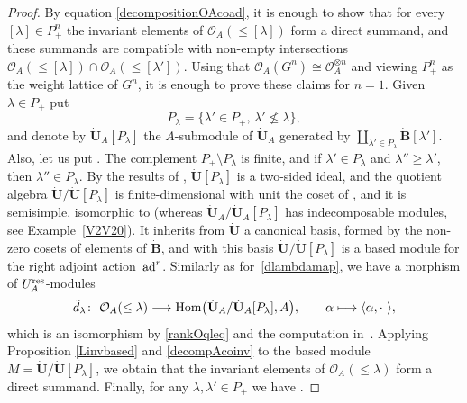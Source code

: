 \documentclass[pdftex]{sigma}
\numberwithin{equation}{section}
\theoremstyle{definition}
\newcommand{\mc}{\mathbb{C}}
\newcommand{\Oo}{{\mathcal O}}
\begin{document}
\begin{proof} By equation \eqref{decompositionOAcoad}, it is enough to show that for every $[\lambda]\in P_+^n$ the invariant elements of $\Oo_A(\leq [\lambda])$ form a direct summand, and these summands are compatible with non-empty intersections $\Oo_A(\leq [\lambda]) \cap \Oo_A(\leq [\lambda'])$. Using that $\Oo_A(G^n) \cong \Oo_A^{\otimes n}$ and viewing $P_+^n$ as the weight lattice of $G^n$, it is enough to prove these claims for $n=1$. Given $\lambda\in P_+$ put
\[P_{\lambda} = \{\lambda'\in P_+, \, \lambda' \nleqslant \lambda\},\]
and denote by $\dot{\mathbf{U}}_A [P_\lambda]$ the $A$-submodule of $\dot{\mathbf{U}}_A$ generated by $\coprod_{\lambda' \in P_\lambda} \dot{\mathbf{B}} [\lambda']$. Also, let us put \smash{$\dot{\mathbf{U}} [P_\lambda]= \dot{\mathbf{U}}_A [P_\lambda]\bigotimes_A \mc(q)$}.
The complement $P_+\setminus P_{\lambda}$ is finite, and if $\lambda'\in P_{\lambda}$ and $\lambda''\geq \lambda'$, then $\lambda''\in P_{\lambda}$. By the results of \cite[Section~29.2]{Lusztig}, $ \dot{\mathbf{U}} [P_\lambda]$ is a two-sided ideal, and the quotient algebra $\dot{\mathbf{U}} / \dot{\mathbf{U}} [P_\lambda]$ is finite-dimensional with unit the coset of , and it is semisimple, isomorphic to  (whereas $\dot{\mathbf{U}}_A / \dot{\mathbf{U}}_A [P_\lambda]$ has indecomposable modules, see Example~\ref{V2V20}).
It inherits from $\dot{\mathbf{U}}$ a canonical basis, formed by the non-zero cosets of elements of $\dot{\mathbf{B}}$, and with this basis $\dot{\mathbf{U}} / \dot{\mathbf{U}} [P_\lambda]$ is a based module for the right adjoint action~${\rm ad}^r$. Similarly as for~\eqref{dlambdamap}, we have a morphism of $U_A^{\rm res}$-modules
\[
\tilde{d}_\lambda\colon\ \Oo_A(\leq \lambda)\longrightarrow {\rm Hom} \big( \dot{\mathbf{U}}_A / \dot{\mathbf{U}}_A [P_\lambda],A\big),\qquad \alpha\longmapsto\langle \alpha , \cdot \ \rangle,\]
which is an isomorphism by \eqref{rankOqleq} and the computation  in~\cite[Section~29.2]{Lusztig}. Applying Proposition \ref{Linvbased} and \eqref{decompAcoinv} to the based module ${M=\dot{\mathbf{U}} / \dot{\mathbf{U}} [P_\lambda]}$, we obtain that the invariant elements of $\Oo_A(\leq \lambda)$ form a direct summand. Finally, for any ${\lambda,\lambda'\!\in\! P_+}$ we have \smash{$\Oo_A(\leq \! \lambda) \cap \Oo_A(\leq \! \lambda')\cong {\rm Hom} \bigl( \dot{\mathbf{U}}_A \!/\bigl(\dot{\mathbf{U}}_A [P_\lambda]+ \dot{\mathbf{U}}_A [P_{\lambda'}]\bigr),A\bigr)$}.

\end{proof}
\end{document}
